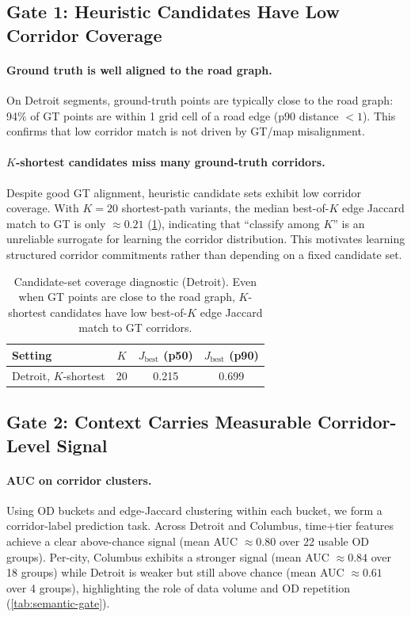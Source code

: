 
\subsection{Gate 1: Heuristic Candidates Have Low Corridor Coverage}

\paragraph{Ground truth is well aligned to the road graph.}
On Detroit segments, ground-truth points are typically close to the road graph: 94\% of GT points are within 1 grid cell of a road edge (p90 distance $<1$).
This confirms that low corridor match is not driven by GT/map misalignment.

\paragraph{$K$-shortest candidates miss many ground-truth corridors.}
Despite good GT alignment, heuristic candidate sets exhibit low corridor coverage.
With $K=20$ shortest-path variants, the median best-of-$K$ edge Jaccard match to GT is only $\approx 0.21$ (\cref{tab:candidate-coverage}), indicating that ``classify among $K$'' is an unreliable surrogate for learning the corridor distribution.
This motivates learning structured corridor commitments rather than depending on a fixed candidate set.

\begin{table}[t]
  \caption{Candidate-set coverage diagnostic (Detroit). Even when GT points are close to the road graph, $K$-shortest candidates have low best-of-$K$ edge Jaccard match to GT corridors.}
  \label{tab:candidate-coverage}
  \vskip 0.1in
  \centering
  \small
  \begin{tabular}{lccc}
    \toprule
    Setting & $K$ & $J_{\mathrm{best}}$ (p50) & $J_{\mathrm{best}}$ (p90) \\
    \midrule
    Detroit, $K$-shortest & 20 & 0.215 & 0.699 \\
    \bottomrule
  \end{tabular}
  \vskip -0.1in
\end{table}

\subsection{Gate 2: Context Carries Measurable Corridor-Level Signal}

\paragraph{AUC on corridor clusters.}
Using OD buckets and edge-Jaccard clustering within each bucket, we form a corridor-label prediction task.
Across Detroit and Columbus, time+tier features achieve a clear above-chance signal (mean AUC $\approx 0.80$ over 22 usable OD groups).
Per-city, Columbus exhibits a stronger signal (mean AUC $\approx 0.84$ over 18 groups) while Detroit is weaker but still above chance (mean AUC $\approx 0.61$ over 4 groups), highlighting the role of data volume and OD repetition (\cref{tab:semantic-gate}).

